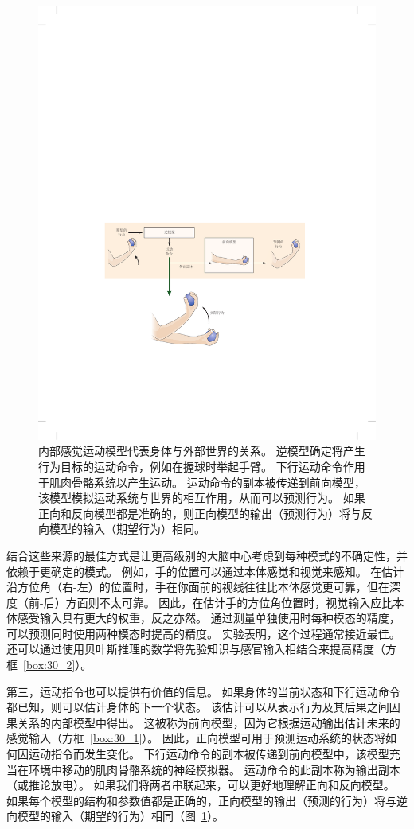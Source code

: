 \begin{figure}[htbp]
	\centering
	\includegraphics[width=0.9\linewidth]{chap30/fig_30_3}
	\caption{内部感觉运动模型代表身体与外部世界的关系。
		逆模型确定将产生行为目标的运动命令，例如在握球时举起手臂。
		下行运动命令作用于肌肉骨骼系统以产生运动。
		运动命令的副本被传递到前向模型，该模型模拟运动系统与世界的相互作用，从而可以预测行为。
		如果正向和反向模型都是准确的，则正向模型的输出（预测行为）将与反向模型的输入（期望行为）相同。}
	\label{fig:30_3}
\end{figure}


结合这些来源的最佳方式是让更高级别的大脑中心考虑到每种模式的不确定性，并依赖于更确定的模式。
例如，手的位置可以通过本体感觉和视觉来感知。
在估计沿方位角（右-左）的位置时，手在你面前的视线往往比本体感觉更可靠，但在深度（前-后）方面则不太可靠。
因此，在估计手的方位角位置时，视觉输入应比本体感受输入具有更大的权重，反之亦然。
通过测量单独使用时每种模态的精度，可以预测同时使用两种模态时提高的精度。
实验表明，这个过程通常接近最佳。 还可以通过使用贝叶斯推理的数学将先验知识与感官输入相结合来提高精度（方框~\ref{box:30_2}）。


第三，运动指令也可以提供有价值的信息。
如果身体的当前状态和下行运动命令都已知，则可以估计身体的下一个状态。
该估计可以从表示行为及其后果之间因果关系的内部模型中得出。
这被称为前向模型，因为它根据运动输出估计未来的感觉输入（方框~\ref{box:30_1}）。
因此，正向模型可用于预测运动系统的状态将如何因运动指令而发生变化。
下行运动命令的副本被传递到前向模型中，该模型充当在环境中移动的肌肉骨骼系统的神经模拟器。
运动命令的此副本称为输出副本（或推论放电）。
如果我们将两者串联起来，可以更好地理解正向和反向模型。
如果每个模型的结构和参数值都是正确的，正向模型的输出（预测的行为）将与逆向模型的输入（期望的行为）相同（图~\ref{fig:30_3}）。


